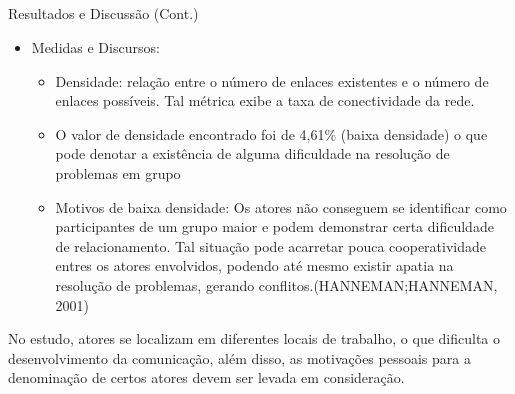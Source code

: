 \documentclass[10pt]{beamer}
\begin{document}
\subsection{}
\begin{frame}{Resultados e Discussão (Cont.)}{}
  \begin{itemize}
    \item Medidas e Discursos:
    \begin{itemize}
    	\item Densidade: relação entre o número de enlaces existentes e o número de enlaces possíveis. Tal métrica exibe a taxa de conectividade da rede. 
	\item O valor de densidade encontrado foi de 4,61\% (baixa densidade) o que pode denotar a existência de alguma dificuldade na resolução de problemas em grupo
	\item Motivos de baixa densidade: Os atores não conseguem se identificar como participantes de um grupo maior e podem demonstrar certa dificuldade de relacionamento. Tal situação pode acarretar pouca cooperatividade entres os atores envolvidos, podendo até mesmo existir apatia na resolução de problemas, gerando conflitos.(HANNEMAN;HANNEMAN, 2001)
    \end{itemize}
  \end{itemize}
  No estudo, atores se localizam em diferentes locais de trabalho, o que dificulta o desenvolvimento da comunicação, além disso, as motivações pessoais para a denominação de certos atores devem ser levada em consideração.
\end{frame}

\section{}
\end{document}
